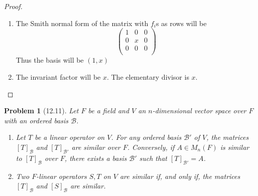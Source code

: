 \documentclass[10pt]{article}
\newcommand{\sk}{\vskip 10mm}
\theoremstyle{plain}
\newtheorem{problem}{Problem}
\theoremstyle{remark}
\begin{document}
\begin{proof}
  \begin{enumerate}
  \item The Smith normal form of the matrix with $f_i$s as rows will be
    \[
      \left(
      \begin{array}{ccc}
        1 & 0 & 0 \\
        0 & x & 0 \\
        0 & 0 & 0\\
      \end{array}
      \right)
    \]
    Thus the basis will be $(1,x)$
  \item The invariant factor will be $x$. The elementary divisor is $x$.
\end{enumerate}
\end{proof}

\sk

\begin{problem}[12.11]
  Let $F$ be a field and $V$ an $n$-dimensional vector space
  over $F$ with an ordered basis $\mathcal{B}$.
  \begin{enumerate}
  \item Let $T$ be a linear operator on $V$. For any ordered basis
    $\mathcal{B}'$ of $V$, the matrices $[T]_{\mathcal{B}}$ and
    $[T]_{\mathcal{B}'}$ are similar over $F$. Conversely, if
    $A\in M_n(F)$ is similar to $[T]_{\mathcal{B}}$ over $F$, there
    exists a basis $\mathcal{B}'$ such that $[T]_{\mathcal{B}'}=A$.
  \item Two $F$-linear operators $S,T$ on $V$ are similar if, and only if,
    the matrices $[T]_{\mathcal{B}}$ and $[S]_{\mathcal{B}}$ are similar.
  \end{enumerate}
\end{problem}
\end{document}
